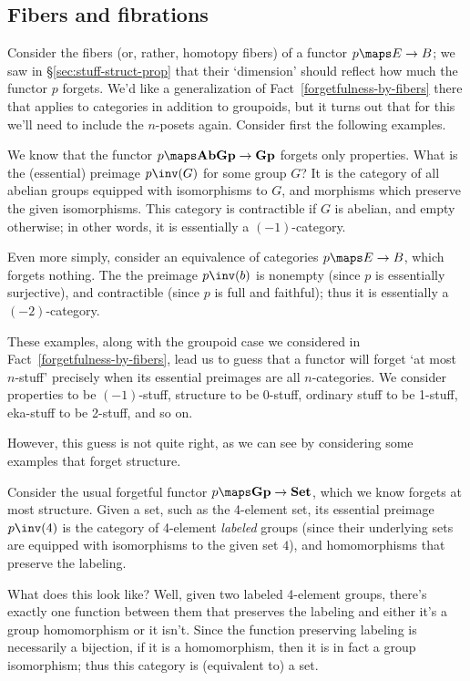 \documentclass[12pt]{amsart}
\begin{document}
\subsection{Fibers and fibrations}
\label{sec:fibers}

Consider the fibers (or, rather, homotopy fibers) of a functor $p\maps
E\to B$; we saw in \S\ref{sec:stuff-struct-prop} that their
`dimension' should reflect how much the functor $p$ forgets.  We'd
like a generalization of Fact~\ref{forgetfulness-by-fibers} there that
applies to categories in addition to groupoids, but it turns out that
for this we'll need to include the $n$-posets again.  Consider first
the following examples.

\begin{eg}
  We know that the functor $p\maps  \mathbf{AbGp}\to \mathbf{Gp}$ forgets
  only properties.  What is the (essential) preimage $p\inv(G)$ for
  some group $G$?  It is the category of all abelian groups equipped
  with isomorphisms to $G$, and morphisms which preserve the given
  isomorphisms.  This category is contractible if $G$ is abelian, and
  empty otherwise; in other words, it is essentially a $(-1)$-category.
\end{eg}

\begin{eg}
  Even more simply, consider an equivalence of categories $p\maps E\to B$,
  which forgets nothing.  The the preimage $p\inv(b)$ is nonempty
  (since $p$ is essentially surjective), and contractible (since $p$
  is full and faithful); thus it is essentially a $(-2)$-category.
\end{eg}

These examples, along with the groupoid case we considered in
Fact~\ref{forgetfulness-by-fibers}, lead us to guess that a functor
will forget `at most $n$-stuff' precisely when its essential preimages
are all $n$-categories.  We consider properties to be $(-1)$-stuff,
structure to be 0-stuff, ordinary stuff to be 1-stuff, eka-stuff to be
2-stuff, and so on.

However, this guess is not quite right, as we can see by considering
some examples that forget structure.

\begin{eg}
  Consider the usual forgetful functor $p\maps
  \mathbf{Gp}\to\mathbf{Set}$, which we know forgets at most
  structure.  Given a set, such as the 4-element set, its essential
  preimage $p\inv(4)$ is the category of 4-element \emph{labeled}
  groups (since their underlying sets are equipped with isomorphisms
  to the given set $4$), and homomorphisms that preserve the labeling.

  What does this look like?  Well, given two labeled 4-element groups,
  there's exactly one function between them that preserves the
  labeling and either it's a group homomorphism or it isn't.  Since
  the function preserving labeling is necessarily a bijection, if it
  is a homomorphism, then it is in fact a group isomorphism; thus this
  category is (equivalent to) a set.
\end{eg}
\end{document}
